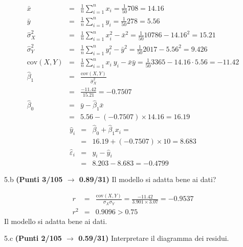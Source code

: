\documentclass[
  11pt,
]{book}
\theoremstyle{mytheoremstyle}
\theoremstyle{mydefstyle}
\newenvironment{sol}
  {
  \begin{tcolorbox}[enhanced,breakable,arc=0.1mm,boxrule=1pt,colback=white,colframe=iblue,
  title=\bf \fontfamily{lmss}\selectfont \hspace{.5 cm} Soluzione,drop fuzzy shadow]

}{
\end{tcolorbox}
  }
\begin{document}
\begin{sol}
\begin{eqnarray*}
           \bar x &=&\frac 1 n\sum_{i=1}^n x_i = \frac {1}{ 50 }  708 =  14.16 \\
           \bar y &=&\frac 1 n\sum_{i=1}^n y_i = \frac {1}{ 50 }  278 =  5.56 \\
           \hat\sigma_X^2&=&\frac 1 n\sum_{i=1}^n x_i^2-\bar x^2=\frac {1}{ 50 }  10786  - 14.16 ^2= 15.21 \\
           \hat\sigma_Y^2&=&\frac 1 n\sum_{i=1}^n y_i^2-\bar y^2=\frac {1}{ 50 }  2017  - 5.56 ^2= 9.426 \\
           \text{cov}(X,Y)&=&\frac 1 n\sum_{i=1}^n x_i~y_i-\bar x\bar y=\frac {1}{ 50 }  3365 - 14.16 \cdot 5.56 = -11.42 \\
           \hat\beta_1 &=& \frac{\text{cov}(X,Y)}{\hat\sigma_X^2} \\
                    &=& \frac{ -11.42 }{ 15.21 }  =  -0.7507 \\
           \hat\beta_0 &=& \bar y - \hat\beta_1 \bar x\\
                    &=&  5.56 - (-0.7507) \times  14.16 = 16.19 
         \end{eqnarray*}\begin{eqnarray*}
\hat y_i &=&\hat\beta_0+\hat\beta_1 x_i=\\ 
&=& 16.19 + (-0.7507) \times 10 = 8.683 \\ 
\hat \varepsilon_i &=& y_i-\hat y_i\\ 
&=& 8.203 - 8.683 = -0.4799  
\end{eqnarray*}

\end{sol}

5.b \textbf{(Punti 3/105 \(\rightarrow\) 0.89/31)} Il modello si adatta bene ai dati?

\begin{sol}
\begin{eqnarray*}
r&=&\frac{\text{cov}(X,Y)}{\sigma_X\sigma_Y}=\frac{ -11.42 }{ 3.901 \times 3.07 }= -0.9537 \\r^2&=& 0.9096 > 0.75
\end{eqnarray*}
Il modello si adatta bene ai dati.

\end{sol}

5.c \textbf{(Punti 2/105 \(\rightarrow\) 0.59/31)} Interpretare il diagramma dei residui.
\end{document}
